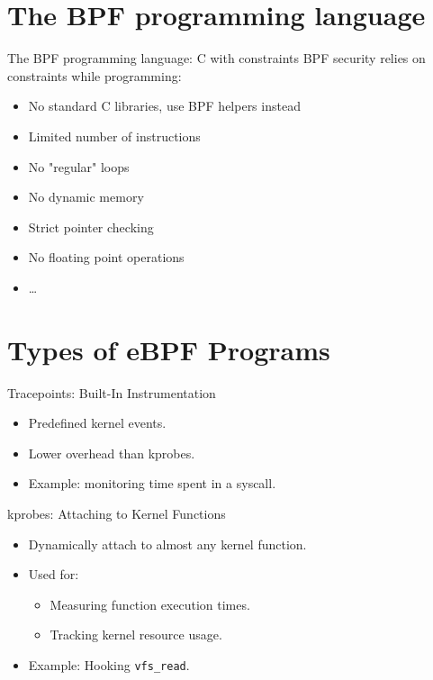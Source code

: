 \documentclass{beamer}
\begin{document}
\section{The BPF programming language}
\begin{frame}{The BPF programming language: C with constraints}
    BPF security relies on constraints while programming:
    \begin{itemize}
        \item No standard C libraries, use BPF helpers instead
        \item Limited number of instructions
        \item No "regular" loops
        \item No dynamic memory
        \item Strict pointer checking
        \item No floating point operations
        \item \dots
    \end{itemize}
\end{frame}

\section{Types of eBPF Programs}
\begin{frame}{Tracepoints: Built-In Instrumentation}
    \begin{itemize}
        \item Predefined kernel events.
        \item Lower overhead than kprobes.
        \item Example: monitoring time spent in a syscall.
    \end{itemize}
\end{frame}

\begin{frame}{kprobes: Attaching to Kernel Functions}
    \begin{itemize}
        \item Dynamically attach to almost any kernel function.
        \item Used for:
        \begin{itemize}
            \item Measuring function execution times.
            \item Tracking kernel resource usage.
        \end{itemize}
        \item Example: Hooking \texttt{vfs\_read}.
    \end{itemize}
\end{frame}
\end{document}
